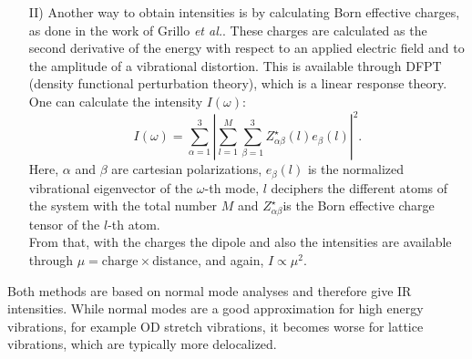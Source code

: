 \documentclass[11pt,DIV=13,BCOR=5mm,a4paper,headinclude]{scrbook}
\begin{document}
\begin{itemize}
 \item[II)] Another way to obtain intensities is by calculating Born effective charges\cite{Born1954}, as done in the work of Grillo \textit{et al.}\cite{BEC}.
 These charges are calculated as the second derivative of the energy with respect to an applied electric field and to the amplitude of a vibrational distortion.
This is available through DFPT\cite{Baroni1987,Giannozzi1991} (density functional perturbation theory), which is a linear response theory.
One can calculate the intensity $I(\omega)$\cite{Bruesch1986,Baroni2001}:
 \begin{equation}
  I(\omega) = \sum_{\alpha=1}^3|\sum_{l=1}^M\sum_{\beta=1}^3 Z_{\alpha\beta}^\star(l)e_\beta(l)|^2.
 \end{equation}
Here, $\alpha$ and $\beta$ are cartesian polarizations, $e_\beta(l)$ is the normalized vibrational eigenvector of the $\omega$-th mode, $l$ deciphers the different atoms of the system with the total number $M$ and $Z_{\alpha\beta}^\star$is the Born effective charge tensor of the $l$-th atom.\\
 From that, with the charges the dipole and also the intensities are available through $\mu=\textrm{charge} \times \textrm{distance}$, and again, $I\propto \mu^2$.
 \end{itemize}
 Both methods are based on normal mode analyses and therefore give IR intensities.
While normal modes are a good approximation for high energy vibrations, for example OD stretch vibrations, it becomes worse for lattice vibrations, which are typically more delocalized.
\end{document}
